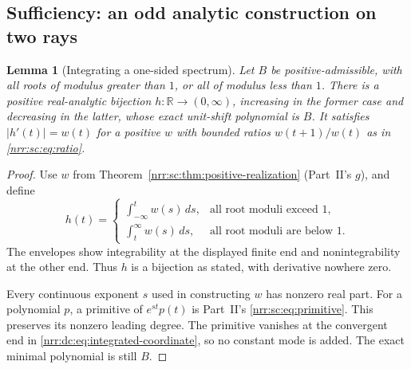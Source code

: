 \documentclass[11pt,letterpaper]{article}
\newtheorem{lemma}[theorem]{Lemma}
\theoremstyle{definition}
\theoremstyle{remark}
\newcommand{\R}{\mathbb R}
\begin{document}
\subsection{Sufficiency: an odd analytic construction on two rays}

\begin{lemma}[Integrating a one-sided spectrum]
\label{nrr:dc:lem:integrating}
Let $B$ be positive-admissible, with all roots of modulus greater than
$1$, or all of modulus less than $1$. There is a positive real-analytic
bijection $h:\R\to(0,\infty)$, increasing in the former case and
decreasing in the latter, whose exact unit-shift polynomial is $B$.
It satisfies $|h'(t)|=w(t)$ for a positive $w$ with bounded ratios
$w(t+1)/w(t)$ as in \eqref{nrr:sc:eq:ratio}.
\end{lemma}
\begin{proof}
Use $w$ from Theorem~\ref{nrr:sc:thm:positive-realization} (Part~II's $g$), and
define
\begin{equation}
 h(t)=
 \begin{cases}
 \displaystyle\int_{-\infty}^{t}w(s)\,ds,&\text{all root moduli exceed }1,\\[6pt]
 \displaystyle\int_t^{\infty}w(s)\,ds,&\text{all root moduli are below }1.
 \end{cases}
 \label{nrr:dc:eq:integrated-coordinate}
\end{equation}
The envelopes show integrability at the displayed finite end and
nonintegrability at the other end. Thus $h$ is a bijection as stated,
with derivative nowhere zero.

Every continuous exponent $s$ used in constructing $w$ has nonzero
real part. For a polynomial $p$, a primitive of $e^{st}p(t)$ is Part~II's
\eqref{nrr:sc:eq:primitive}. This preserves its nonzero leading degree. The
primitive vanishes at the convergent end in
\eqref{nrr:dc:eq:integrated-coordinate}, so no constant mode is added. The
exact minimal polynomial is still $B$.
\end{proof}
\end{document}
